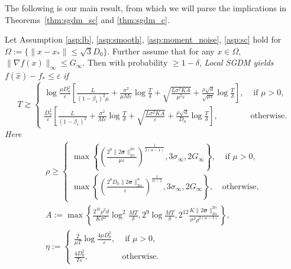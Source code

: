 \documentclass{article} %
\numberwithin{equation}{section}
\begin{document}
The following is our main result, from which we will parse the implications in Theorems~\ref{thm:sgdm_sc} and \ref{thm:sgdm_c}.
\begin{thm}\label{app:thm:sgdm}
    Let Assumption \ref{asp:lb}, \ref{asp:smooth}, \ref{asp:moment_noise}, \ref{asp:sc} hold for $\Omega:=\{\|x-x_*\|\leq \sqrt{3}D_0\}$. Further assume that for any $x\in\Omega$, $\|\nabla f(x)\|_{\infty}\leq G_{\infty}$.
    Then with probability $\geq 1-\delta$, \em Local \em SGDM yields $f(\hat{x})-f_* \leq \varepsilon$ if  
    \begin{equation}\label{app:eq:T_bound_sgdm}
        T\gtrsim \left\{
            \begin{array}{ll}
                \log\frac{\mu D_0^2}{\varepsilon}\left[\frac{L}{(1-\beta_1)^2\mu}+\frac{\sigma^2}{\mu M \varepsilon}\log\frac{T}{\delta}+\sqrt{\frac{L\sigma^2KA}{\mu^2\varepsilon}}+\frac{\rho\sqrt{d}}{\sqrt{\mu\varepsilon}}\log\frac{T}{\delta}\right], & \text{ if $\mu>0$}, \\
                \frac{D_0^2}{\varepsilon}\left[\frac{L}{(1-\beta_1)^2}+\frac{\sigma^2}{M \varepsilon}\log\frac{T}{\delta}+\sqrt{\frac{L\sigma^2KA}{\varepsilon}}+\frac{\rho\sqrt{d}}{D_0}\log\frac{T}{\delta}\right], & \text{otherwise}.
            \end{array}
        \right.
    \end{equation}
    Here
    \begin{equation}\label{eq:hyperpara_sgdm}
        \begin{array}{l}
            \rho\geq \left\{
                \begin{array}{ll}
                    \max\left\{\left(\frac{2^8\|2\boldsymbol{\sigma}\|_{2\alpha}^{2\alpha}}{\mu\varepsilon}\right)^{\frac{1}{2(\alpha-1)}}, 3\sigma_\infty, 2G_{\infty}\right\}, & \text{ if $\mu>0$}, \\
                    \max\left\{\left(\frac{2^8D_0\|2\boldsymbol{\sigma}\|_{2\alpha}^{\alpha}}{\varepsilon}\right)^{\frac{1}{\alpha-1}}, 3\sigma_\infty, 2G_{\infty}\right\}, & \text{otherwise},
                \end{array}
            \right. \\
            A:=\max\left\{\frac{2^{10}\rho^2d}{K\sigma^2}\log^2\frac{MT}{\delta}, 2^9\log\frac{MT}{\delta}, 2^{12}\frac{K\|2\boldsymbol{\sigma}\|_{2\alpha}^{2\alpha}}{\sigma^2\rho^{2(\alpha-1)}} \right\}, \\
            \eta:= \left\{
                \begin{array}{ll}
                    \frac{2}{\mu T}\log\frac{4\mu D_0^2}{\varepsilon}, & \text{ if $\mu>0$}, \\
                    \frac{4D_0^2}{T\varepsilon}, & \text{otherwise}.
                \end{array}
            \right.
        \end{array}
    \end{equation}
\end{thm}
\end{document}
